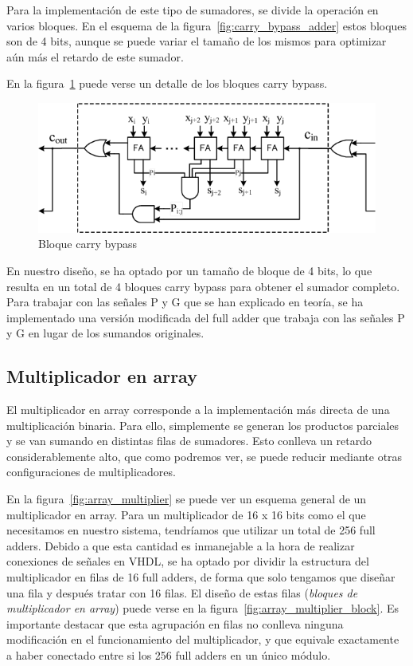 \documentclass[a4paper,12pt]{article}
\begin{document}
Para la implementación de este tipo de sumadores, se divide la operación en varios bloques. En el esquema de la figura~\ref{fig:carry_bypass_adder} estos bloques son de 4 bits, aunque se puede variar el tamaño de los mismos para optimizar aún más el retardo de este sumador.

En la figura~\ref{fig:carry_skip_block} puede verse un detalle de los bloques carry bypass.

\begin{figure}[hbt]
\includegraphics[width=\textwidth]{img/carryskipblock.png} 
\caption{Bloque carry bypass} \label{fig:carry_skip_block}
\end{figure}

En nuestro diseño, se ha optado por un tamaño de bloque de 4 bits, lo que resulta en un total de 4 bloques carry bypass para obtener el sumador completo. Para trabajar con las señales P y G que se han explicado en teoría, se ha implementado una versión modificada del full adder que trabaja con las señales P y G en lugar de los sumandos originales.
\clearpage
\subsection{Multiplicador en array}
El multiplicador en array corresponde a la implementación más directa de una multiplicación binaria. Para ello, simplemente se generan los productos parciales y se van sumando en distintas filas de sumadores. Esto conlleva un retardo considerablemente alto, que como podremos ver, se puede reducir mediante otras configuraciones de multiplicadores.

En la figura~\ref{fig:array_multiplier} se puede ver un esquema general de un multiplicador en array. Para un multiplicador de 16 x 16 bits como el que necesitamos en nuestro sistema, tendríamos que utilizar un total de 256 full adders. Debido a que esta cantidad es inmanejable a la hora de realizar conexiones de señales en VHDL, se ha optado por dividir la estructura del multiplicador en filas de 16 full adders, de forma que solo tengamos que diseñar una fila y después tratar con 16 filas. El diseño de estas filas (\emph{bloques de multiplicador en array}) puede verse en la figura~\ref{fig:array_multiplier_block}. Es importante destacar que esta agrupación en filas no conlleva ninguna modificación en el funcionamiento del multiplicador, y que equivale exactamente a haber conectado entre si los 256 full adders en un único módulo.
\end{document}
